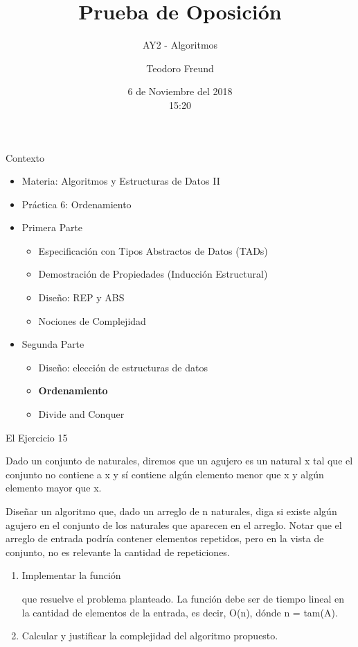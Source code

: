 \documentclass[pdf
]{beamer}
\title{Prueba de Oposición}
\subtitle{AY2 - Algoritmos}
\author{\large{Teodoro Freund}}
\date{6 de Noviembre del 2018 \\ \footnotesize{15:20}} %
\begin{document}
\begin{frame}
\titlepage
\end{frame}

\begin{frame}{Contexto}
\begin{itemize}
\item Materia: Algoritmos y Estructuras de Datos II
\pause
\item Práctica 6: Ordenamiento
\pause
\item Primera Parte
\begin{itemize}
\item Especificación con Tipos Abstractos de Datos (TADs)
\item Demostración de Propiedades (Inducción Estructural)
\item Diseño: REP y ABS
\item Nociones de Complejidad
\end{itemize}

\item Segunda Parte
\begin{itemize}

\item Diseño: elección de estructuras de datos
\pause
\item \textbf{Ordenamiento}
\pause
\item Divide and Conquer
\end{itemize}
\end{itemize}

\end{frame}

\begin{frame}{El Ejercicio 15}

Dado un conjunto de naturales, diremos que un agujero es un natural x tal que el conjunto no contiene a x y sí contiene algún elemento menor que x y algún elemento mayor que x.

\vspace{10pt}

\pause
Diseñar un algoritmo que, dado un arreglo de n naturales, diga si existe algún agujero en el conjunto de los naturales que aparecen en el arreglo. Notar que el arreglo de entrada podría contener elementos repetidos, pero en la vista de conjunto, no es relevante la cantidad de repeticiones.

\vspace{10pt}

\pause
\begin{enumerate}
\item {Implementar la función 

que resuelve el problema planteado. La función debe ser de tiempo lineal en la cantidad de elementos de la entrada, es decir, O(n), dónde n = tam(A).}
\pause
\item {Calcular y justificar la complejidad del algoritmo propuesto.}
\end{enumerate}



\end{frame}
\end{document}

